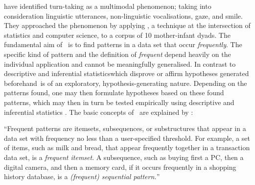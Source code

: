 \citet{rohlfing_multimodal_underreview} have identified turn-taking as a multimodal phenomenon; taking into consideration linguistic utterances, non-linguistic vocalisations, gaze, and smile.
They approached the phenomenon by applying \fpmlower, a technique at the intersection of statistics and computer science, to a corpus of 10 mother-infant dyads.
The fundamental aim of \fpmlower\ is to find patterns in a data set that occur \emph{frequently}.
The specific kind of pattern and the definition of \emph{frequent} depend heavily on the individual application and cannot be meaningfully generalised.
In contrast to descriptive and inferential statistics\dash which disprove or affirm hypotheses generated beforehand\dash \fpmlower\ is of an exploratory, hypothesis-generating nature.
Depending on the patterns found, one may then formulate hypotheses based on these found patterns, which may then in turn be tested empirically using descriptive and inferential statistics \cite[]{rohlfing_multimodal_underreview,han_data_2012}.
The basic concepts of \fpmlower\ are explained by \citet[, emphasis in original]{han_frequent_2007}:
\begin{customquote}
``Frequent patterns are itemsets, subsequences, or substructures that appear in a data set with frequency no less than a user-specified threshold.
For example, a set of items, such as milk and bread, that appear frequently together in a transaction data set, is a \emph{frequent itemset}.
A subsequence, such as buying first a PC, then a digital camera, and then a memory card, if it occurs frequently in a shopping history database, is a \emph{(frequent) sequential pattern.}''
\end{customquote}

